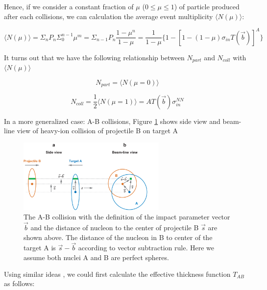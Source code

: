 Hence, if we consider a constant fraction of $\mu$ ($0 \le \mu \le 1$) of particle produced after each collisions, we can calculation the average event multiplicity $\langle N(\mu) \rangle$:

\begin{equation}
\langle N(\mu) \rangle = \Sigma_n P_n \Sigma^{n-1}_0 \mu^m =  \Sigma_{n-1} P_n \frac{1 - \mu^n}{1 - \mu} = \frac{1}{1-\mu} \{ 1 - [1 - (1-\mu) \sigma_{in} T(\vec{b})]^A \}
\end{equation}

It turns out that we have the following relationship between $N_{part}$ and $N_{coll}$ with $\langle  N(\mu) \rangle$  \cite{Glauber}

\begin{equation}
N_{part} = \langle N(\mu = 0) \rangle 
\end{equation}

\begin{equation}
N_{coll} = \frac{1}{2} \langle N(\mu = 1) \rangle = A T(\vec{b}) \sigma_{in}^{NN}
\end{equation}

In a more generalized case: A-B collisions, Figure \ref{GlauberRef} shows side view and beam-line view of heavy-ion collision of projectile B on target A


\begin{figure}[hbtp]
\begin{center}
\includegraphics[width=0.65\textwidth]{Figures/Chapter1/GlauDefColl.png}
\caption{The A-B collision with the definition of the impact parameter vector $\vec{b}$ and the distance of nucleon to the center of projectile B $\vec{s}$ are shown above. The distance of the nucleon in B to center of the target A is $\vec{s}-\vec{b}$ according to vector subtraction rule. Here we assume both nuclei A and B are perfect spheres.}
\label{GlauberRef}
\end{center}
\end{figure} 

Using similar ideas \cite{CentPlot}, we could first calculate the effective thickness function $T_{AB}$ as follows:


